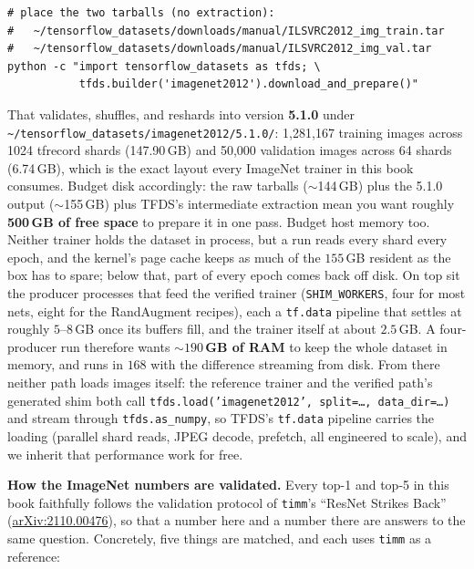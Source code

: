 \begin{verbatim}
# place the two tarballs (no extraction):
#   ~/tensorflow_datasets/downloads/manual/ILSVRC2012_img_train.tar
#   ~/tensorflow_datasets/downloads/manual/ILSVRC2012_img_val.tar
python -c "import tensorflow_datasets as tfds; \
           tfds.builder('imagenet2012').download_and_prepare()"
\end{verbatim}

\noindent That validates, shuffles, and reshards into version
\textbf{5.1.0} under
\texttt{\textasciitilde/tensorflow\_datasets/imagenet2012/5.1.0/}:
1{,}281{,}167 training images across 1024 tfrecord shards (147.90\,GB)
and 50{,}000 validation images across 64 shards (6.74\,GB), which is the
exact layout every ImageNet trainer in this book consumes. Budget disk
accordingly: the raw tarballs ($\sim$144\,GB) plus the 5.1.0 output
($\sim$155\,GB) plus TFDS's intermediate extraction mean you want roughly
\textbf{500\,GB of free space} to prepare it in one pass. Budget host
memory too. Neither trainer holds the dataset in process, but a run reads
every shard every epoch, and the kernel's page cache keeps as much of the
$155$\,GB resident as the box has to spare; below that, part of every
epoch comes back off disk. On top sit the producer processes that feed
the verified trainer (\texttt{SHIM\_WORKERS}, four for most nets, eight
for the RandAugment recipes), each a \texttt{tf.data} pipeline that
settles at roughly $5$--$8$\,GB once its buffers fill, and the trainer
itself at about $2.5$\,GB. A four-producer run therefore wants
\textbf{${\sim}190$\,GB of RAM} to keep the whole dataset in memory, and
runs in $168$ with the difference streaming from disk. From there
neither path loads images itself: the reference trainer and the verified
path's generated shim both call
\texttt{tfds.load('imagenet2012', split=\ldots, data\_dir=\ldots)} and
stream through \texttt{tfds.as\_numpy}, so TFDS's \texttt{tf.data}
pipeline carries the loading (parallel shard reads, JPEG decode,
prefetch, all engineered to scale), and we inherit that performance work
for free.

\medskip\noindent\textbf{How the ImageNet numbers are validated.} Every
top-1 and top-5 in this book faithfully follows the validation protocol of
\texttt{timm}'s ``ResNet Strikes Back''
(\href{https://arxiv.org/abs/2110.00476}{arXiv:2110.00476}), so that a
number here and a number there are answers to the same question.
Concretely, five things are matched, and each uses \texttt{timm} as a
reference:

